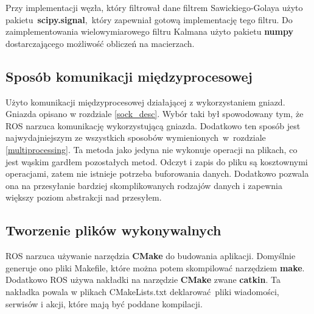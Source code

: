 {{        Przy implementacji węzła, który filtrował dane filtrem Sawickiego-Golaya użyto pakietu~\textbf{scipy.signal},~który zapewniał gotową implementację tego filtru. Do zaimplementowania wielowymiarowego filtru Kalmana użyto pakietu \textbf{numpy} dostarczającego możliwość obliczeń na macierzach. 
    }
    \subsection{Sposób komunikacji międzyprocesowej}
    {
        Użyto komunikacji międzyprocesowej działającej z wykorzystaniem gniazd. Gniazda opisano w rozdziale \ref{sock_desc}. Wybór taki był spowodowany tym, że ROS narzuca komunikację wykorzystującą gniazda. Dodatkowo ten sposób jest najwydajniejszym ze wszystkich sposobów wymienionych~w~rozdziale \ref{multiprocessing}. Ta metoda jako jedyna nie wykonuje operacji na plikach, co jest wąskim gardłem pozostałych metod. Odczyt i zapis do pliku są kosztownymi operacjami, zatem nie istnieje potrzeba buforowania danych. Dodatkowo pozwala ona na przesyłanie bardziej skomplikowanych rodzajów danych i zapewnia większy poziom abstrakcji nad przesyłem. 
    }
    \subsection{Tworzenie plików wykonywalnych}
    {
        ROS narzuca używanie narzędzia \textbf{CMake} do budowania aplikacji. Domyślnie generuje ono pliki Makefile, które można potem skompilować narzędziem \textbf{make}. Dodatkowo ROS używa nakładki na narzędzie \textbf{CMake} zwane \textbf{catkin}. Ta nakładka powala w plikach CMakeLists.txt deklarować pliki wiadomości, serwisów i akcji, które mają być poddane kompilacji. 
    }
}